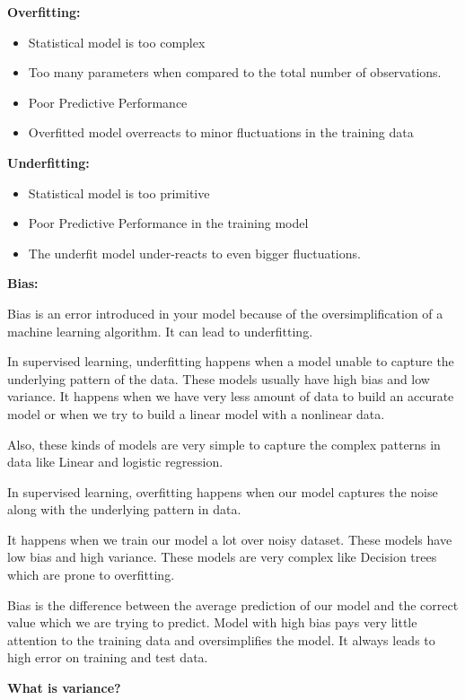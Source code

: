 \documentclass[
]{book}
\begin{document}
\textbf{Overfitting:}

\begin{itemize}
\item
  Statistical model is too complex
\item
  Too many parameters when compared to the total number of observations.
\item
  Poor Predictive Performance
\item
  Overfitted model overreacts to minor fluctuations in the training data
\end{itemize}

\textbf{Underfitting:}

\begin{itemize}
\item
  Statistical model is too primitive
\item
  Poor Predictive Performance in the training model
\item
  The underfit model under-reacts to even bigger fluctuations.
\end{itemize}

\textbf{Bias:}

Bias is an error introduced in your model because of the oversimplification of a machine learning algorithm. It can lead to underfitting.

In supervised learning, underfitting happens when a model unable to capture the underlying pattern of the data. These models usually have high bias and low variance. It happens when we have very less amount of data to build an accurate model or when we try to build a linear model with a nonlinear data.

Also, these kinds of models are very simple to capture the complex patterns in data like Linear and logistic regression.

In supervised learning, overfitting happens when our model captures the noise along with the underlying pattern in data.

It happens when we train our model a lot over noisy dataset. These models have low bias and high variance. These models are very complex like Decision trees which are prone to overfitting.

Bias is the difference between the average prediction of our model and the correct value which we are trying to predict. Model with high bias pays very little attention to the training data and oversimplifies the model. It always leads to high error on training and test data.

\textbf{What is variance?}
\end{document}
